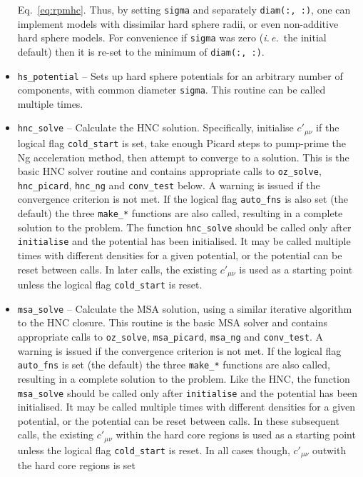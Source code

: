 \documentclass[12pt,a4paper]{article}
\newcommand{\latin}[1]{\emph{#1}}
\newcommand{\ie}{\latin{i.\,e.}}
\newcommand{\Eqref}[1]{Eq.~\eqref{#1}}
\begin{document}
\begin{itemize}
  \Eqref{eq:rpmhc}. Thus, by setting \verb+sigma+ and separately
  \verb+diam(:, :)+, one can implement models with dissimilar hard
  sphere radii, or even non-additive hard sphere models.  For
  convenience if \verb+sigma+ was zero (\ie\ the initial default) then it
  is re-set to the minimum of \verb+diam(:, :)+.
%
\item\verb+hs_potential+ -- Sets up hard sphere potentials for an
  arbitrary number of components, with common diameter \verb+sigma+.
  This routine can be called multiple times.
%
\item\verb+hnc_solve+ -- Calculate the HNC solution.  Specifically,
  initialise $c'_{\mu\nu}$ if the logical flag \verb+cold_start+ is
  set, take enough Picard steps to pump-prime the Ng acceleration
  method, then attempt to converge to a solution.  This is the basic
  HNC solver routine and contains appropriate calls to
  \verb+oz_solve+, \verb+hnc_picard+, \verb+hnc_ng+ and
  \verb+conv_test+ below.  A warning is issued if the convergence
  criterion is not met.  If the logical flag \verb+auto_fns+ is also
  set (the default) the three \verb+make_*+ functions are also called,
  resulting in a complete solution to the problem.  The function
  \verb+hnc_solve+ should be called only after \verb+initialise+ and
  the potential has been initialised.  It may be called multiple times
  with different densities for a given potential, or the potential can
  be reset between calls.  In later calls, the existing $c'_{\mu\nu}$
  is used as a starting point unless the logical flag \verb+cold_start+ is
  reset.
%
\item\verb+msa_solve+ -- Calculate the MSA solution, using a similar
  iterative algorithm to the HNC closure. This routine is the basic
  MSA solver and contains appropriate calls to \verb+oz_solve+,
  \verb+msa_picard+, \verb+msa_ng+ and \verb+conv_test+.  A warning is
  issued if the convergence criterion is not met.  If the logical flag
  \verb+auto_fns+ is set (the default) the three \verb+make_*+
  functions are also called, resulting in a complete solution to the
  problem.  Like the HNC, the function \verb+msa_solve+ should be
  called only after \verb+initialise+ and the potential has been
  initialised.  It may be called multiple times with different
  densities for a given potential, or the potential can be reset
  between calls.  In these subsequent calls, the existing
  $c'_{\mu\nu}$ within the hard core regions is used as a starting
  point unless the logical flag \verb+cold_start+ is reset. In all
  cases though, $c'_{\mu\nu}$ outwith the hard core regions is set

\end{itemize}
\end{document}
